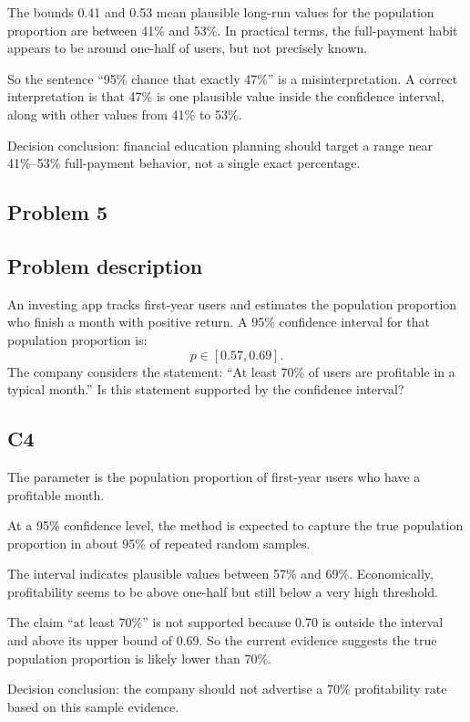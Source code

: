 \begin{ExamProblems}
		The bounds 0.41 and 0.53 mean plausible long-run values for the population proportion are between 41\% and 53\%.
		In practical terms, the full-payment habit appears to be around one-half of users, but not precisely known.

		So the sentence ``95\% chance that exactly 47\%'' is a misinterpretation.
		A correct interpretation is that 47\% is one plausible value inside the confidence interval, along with other values from 41\% to 53\%.

		Decision conclusion: financial education planning should target a range near 41\%--53\% full-payment behavior, not a single exact percentage.

		\newpage
		\item
		\subsection*{Problem 5}
		\subsection*{Problem description}
		An investing app tracks first-year users and estimates the population proportion who finish a month with positive return.
		A 95\% confidence interval for that population proportion is:
		\[
		p \in [0.57, 0.69].
		\]
		The company considers the statement: ``At least 70\% of users are profitable in a typical month.''
		Is this statement supported by the confidence interval?

		\subsection*{C4}
		The parameter is the population proportion of first-year users who have a profitable month.

		At a 95\% confidence level, the method is expected to capture the true population proportion in about 95\% of repeated random samples.

		The interval indicates plausible values between 57\% and 69\%.
		Economically, profitability seems to be above one-half but still below a very high threshold.

		The claim ``at least 70\%'' is not supported because 0.70 is outside the interval and above its upper bound of 0.69.
		So the current evidence suggests the true population proportion is likely lower than 70\%.

		Decision conclusion: the company should not advertise a 70\% profitability rate based on this sample evidence.


\end{ExamProblems}
